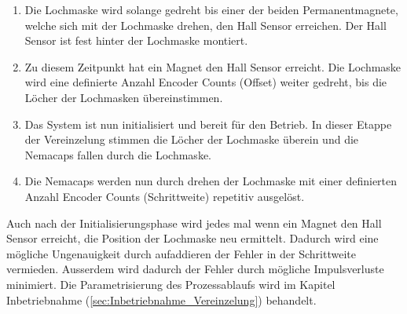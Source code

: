 \begin{enumerate}
	\item Die Lochmaske wird solange gedreht bis einer der beiden Permanentmagnete, welche sich mit der Lochmaske drehen, den Hall Sensor erreichen. Der Hall Sensor ist fest hinter der Lochmaske montiert.
 	\item Zu diesem Zeitpunkt hat ein Magnet den Hall Sensor erreicht. Die Lochmaske wird eine definierte Anzahl Encoder Counts (Offset) weiter gedreht, bis die Löcher der Lochmasken übereinstimmen.
 	\item Das System ist nun initialisiert und bereit für den Betrieb. In dieser Etappe der Vereinzelung stimmen die Löcher der Lochmaske überein und die Nemacaps fallen durch die Lochmaske. 
	\item Die Nemacaps werden nun durch drehen der Lochmaske mit einer definierten Anzahl Encoder Counts (Schrittweite) repetitiv ausgelöst.
\end{enumerate}

Auch nach der Initialisierungsphase wird jedes mal wenn ein Magnet den Hall Sensor erreicht, die Position der Lochmaske neu ermittelt. Dadurch wird eine mögliche Ungenauigkeit durch aufaddieren der Fehler in der Schrittweite vermieden. Ausserdem wird dadurch der Fehler durch mögliche Impulsverluste minimiert. Die Parametrisierung des Prozessablaufs wird im Kapitel Inbetriebnahme (\ref{sec:Inbetriebnahme_Vereinzelung}) behandelt. 
